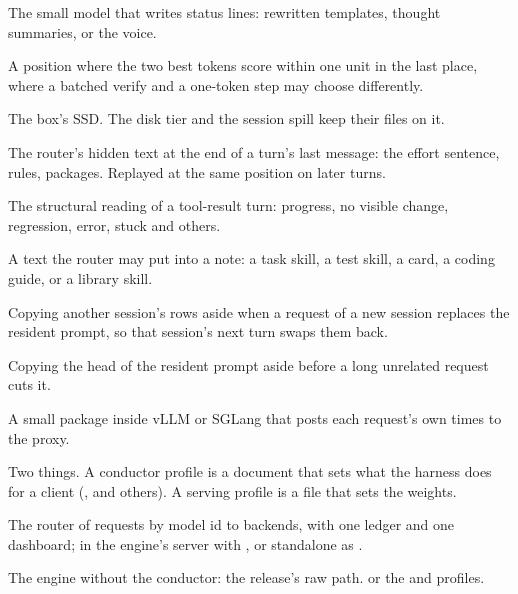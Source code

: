 \begin{description}[style=unboxed, leftmargin=0pt, itemsep=.5ex, font=\normalfont\bfseries]
\item[narrator] The small model that writes status lines: rewritten templates, thought summaries, or the voice.

\item[near tie] A position where the two best tokens score within one unit in the last place, where a batched verify and a one-token step may choose differently.

\item[NVMe] The box's SSD. The disk tier and the session spill keep their files on it.

\item[note] The router's hidden text at the end of a turn's last message: the effort sentence, rules, packages. Replayed at the same position on later turns.

\item[outcome] The structural reading of a tool-result turn: progress, no visible change, regression, error, stuck and others.

\item[package] A text the router may put into a note: a task skill, a test skill, a card, a coding guide, or a library skill.

\item[park] Copying another session's rows aside when a request of a new session replaces the resident prompt, so that session's next turn swaps them back.

\item[pin] Copying the head of the resident prompt aside before a long unrelated request cuts it.

\item[plugin] A small package inside vLLM or SGLang that posts each request's own times to the proxy.

\item[profile] Two things. A conductor profile is a document that sets what the harness does for a client (,  and others). A serving profile is a  file that sets the weights.

\item[proxy] The router of requests by model id to backends, with one ledger and one dashboard; in the engine's server with , or standalone as .

\item[raw] The engine without the conductor: the release's raw path.  or the  and  profiles.


\end{description}
